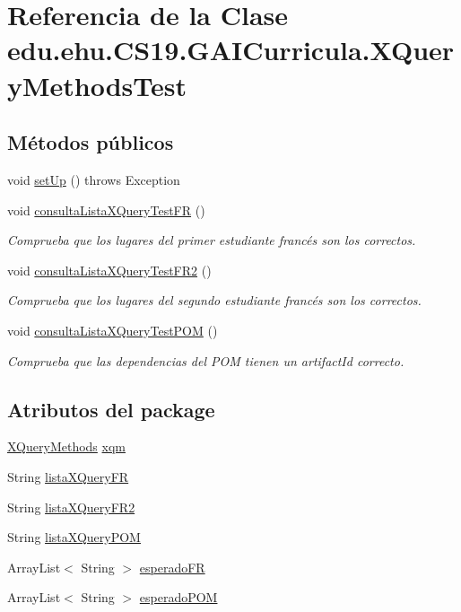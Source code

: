 \hypertarget{a00037}{}\section{Referencia de la Clase edu.\+ehu.\+C\+S19.\+G\+A\+I\+Curricula.\+X\+Query\+Methods\+Test}
\label{a00037}
\subsection*{Métodos públicos}
\begin{DoxyCompactItemize}
\item 
void \mbox{\hyperlink{a00037_a7fea8bc0d25f1588cba324be6bcd088e}{set\+Up}} ()  throws Exception 
\item 
void \mbox{\hyperlink{a00037_a9c391172ac7518b50fad0569a710d3e7}{consulta\+Lista\+X\+Query\+Test\+FR}} ()
\begin{DoxyCompactList}\small\item\em Comprueba que los lugares del primer estudiante francés son los correctos. \end{DoxyCompactList}\item 
void \mbox{\hyperlink{a00037_ab30b1e554a49678887f748e9050ec173}{consulta\+Lista\+X\+Query\+Test\+F\+R2}} ()
\begin{DoxyCompactList}\small\item\em Comprueba que los lugares del segundo estudiante francés son los correctos. \end{DoxyCompactList}\item 
void \mbox{\hyperlink{a00037_a424440e0527b515a698294d6859d258a}{consulta\+Lista\+X\+Query\+Test\+P\+OM}} ()
\begin{DoxyCompactList}\small\item\em Comprueba que las dependencias del P\+OM tienen un artifact\+Id correcto. \end{DoxyCompactList}\end{DoxyCompactItemize}
\subsection*{Atributos del \textquotesingle{}package\textquotesingle{}}
\begin{DoxyCompactItemize}
\item 
\mbox{\hyperlink{a00033}{X\+Query\+Methods}} \mbox{\hyperlink{a00037_a39a41e2d9871da80d3ac11ea85702ed3}{xqm}}
\item 
String \mbox{\hyperlink{a00037_a716ee793e86b28484041d2ada3d13266}{lista\+X\+Query\+FR}}
\item 
String \mbox{\hyperlink{a00037_abfdb5b674e64249ab393c5d71ccd9c9e}{lista\+X\+Query\+F\+R2}}
\item 
String \mbox{\hyperlink{a00037_af899b7ca0c5c00c09a1265e7975c66a1}{lista\+X\+Query\+P\+OM}}
\item 
Array\+List$<$ String $>$ \mbox{\hyperlink{a00037_aee6b73a3384d4b23a34648334a099b97}{esperado\+FR}}
\item 
Array\+List$<$ String $>$ \mbox{\hyperlink{a00037_ab6d2fa743081f2227d9a4e00d9718458}{esperado\+P\+OM}}
\end{DoxyCompactItemize}


